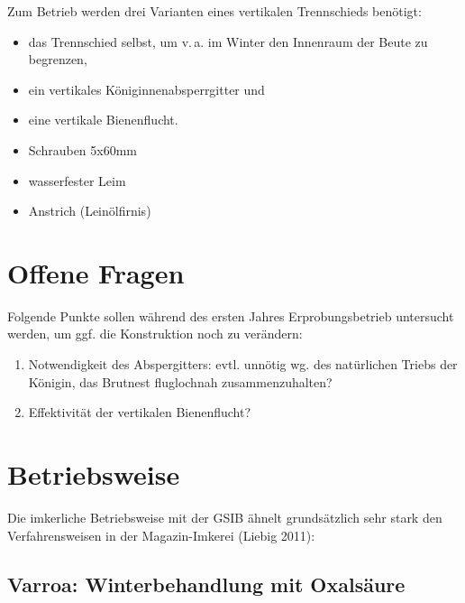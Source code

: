 \documentclass[12pt,a4paper,ngerman]{scrartcl}
\begin{document}
Zum Betrieb werden drei Varianten eines vertikalen Trennschieds benötigt:

\begin{itemize}
\item das Trennschied selbst, um v.\,a. im Winter den Innenraum der Beute zu begrenzen,
\item ein vertikales Königinnenabsperrgitter und
\item eine vertikale Bienenflucht.
\end{itemize}



\begin{itemize}
\item Schrauben 5x60mm
\item wasserfester Leim
\item Anstrich (Leinölfirnis)
\end{itemize}


\section{Offene Fragen}

Folgende Punkte sollen während des ersten Jahres Erprobungsbetrieb untersucht werden, um ggf. die Konstruktion noch zu verändern:

\begin{enumerate}
\item Notwendigkeit des Abspergitters: evtl. unnötig wg. des natürlichen Triebs der Königin, das Brutnest fluglochnah zusammenzuhalten?
\item Effektivität der vertikalen Bienenflucht?
\end{enumerate}


\section{Betriebsweise}

Die imkerliche Betriebsweise mit der GSIB ähnelt grundsätzlich sehr stark den Verfahrensweisen in der Magazin-Imkerei (Liebig 2011):


\subsection{Varroa: Winterbehandlung mit Oxalsäure}
\end{document}
